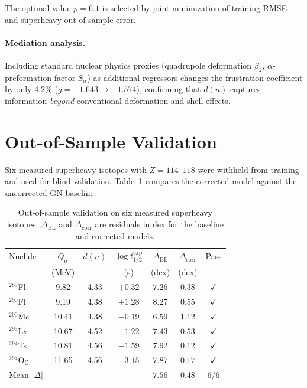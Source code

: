\documentclass[aps,prc,twocolumn,showpacs,preprintnumbers,amsmath,amssymb]{revtex4-2}
\newcommand{\thalf}{t_{1/2}}
\newcommand{\Qalpha}{Q_\alpha}
\newcommand{\dn}{d(n)}
\begin{document}
The optimal value $p = 6.1$ is selected by joint minimization of
training RMSE and superheavy out-of-sample error.

\paragraph{Mediation analysis.}
Including standard nuclear physics proxies (quadrupole deformation
$\beta_2$, $\alpha$-preformation factor $S_\alpha$) as additional
regressors changes the frustration coefficient by only 4.2\%
($g = -1.643 \to -1.574$), confirming that $\dn$ captures
information \emph{beyond} conventional deformation and shell
effects.

\section{Out-of-Sample Validation}
\label{sec:oos}

Six measured superheavy isotopes with $Z = 114$--$118$ were
withheld from training and used for blind validation.
Table~\ref{tab:oos} compares the corrected model against the
uncorrected GN baseline.

\begin{table}[h]
\centering
\caption{Out-of-sample validation on six measured superheavy
  isotopes.  $\Delta_{\mathrm{BL}}$ and $\Delta_{\mathrm{corr}}$
  are residuals in dex for the baseline and corrected models.}
\label{tab:oos}
\begin{tabular}{@{}lcccccc@{}}
\toprule
Nuclide & $\Qalpha$ & $\dn$ & $\log\thalf^{\mathrm{exp}}$ &
  $\Delta_{\mathrm{BL}}$ & $\Delta_{\mathrm{corr}}$ & Pass \\
  & (MeV) & & (s) & (dex) & (dex) & \\
\midrule
${}^{289}$Fl & 9.82 & 4.33 & $+0.32$ & $7.26$ & $0.38$ & $\checkmark$ \\
${}^{290}$Fl & 9.19 & 4.38 & $+1.28$ & $8.27$ & $0.55$ & $\checkmark$ \\
${}^{290}$Mc & 10.41 & 4.38 & $-0.19$ & $6.59$ & $1.12$ & $\checkmark$ \\
${}^{293}$Lv & 10.67 & 4.52 & $-1.22$ & $7.43$ & $0.53$ & $\checkmark$ \\
${}^{294}$Ts & 10.81 & 4.56 & $-1.59$ & $7.92$ & $0.12$ & $\checkmark$ \\
${}^{294}$Og & 11.65 & 4.56 & $-3.15$ & $7.87$ & $0.17$ & $\checkmark$ \\
\midrule
Mean $|\Delta|$ & & & & $7.56$ & $0.48$ & 6/6 \\
\bottomrule
\end{tabular}
\end{table}
\end{document}
